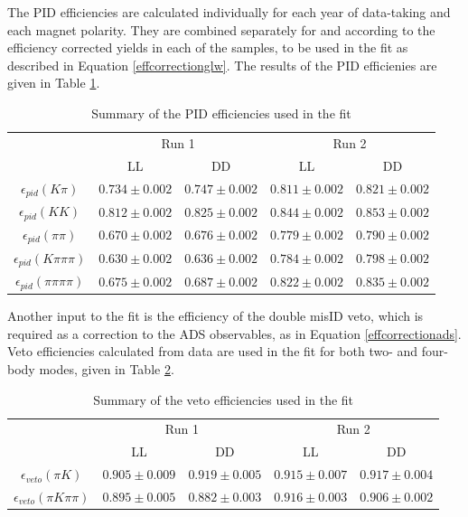 The PID efficiencies are calculated individually for each year of data-taking and each magnet polarity. They are combined separately for \runone and \runtwo according to the efficiency corrected yields in each of the samples, to be used in the \CP fit as described in Equation \ref{effcorrectionglw}. The results of the PID efficienies are given in Table \ref{pideff}.

\begin{table}[h]
\centering
\begin{tabular}{c|cc|cc}
\hline
& \multicolumn{2}{c}{Run 1} & \multicolumn{2}{c}{Run 2} \\
& LL & DD & LL & DD \\
\hline
$\epsilon_{pid}(K\pi)$ & $0.734 \pm 0.002$ & $0.747 \pm 0.002$ & $0.811 \pm 0.002$ & $0.821 \pm 0.002$ \\
$\epsilon_{pid}(KK)$ & $0.812 \pm 0.002$ & $0.825 \pm 0.002$ & $0.844 \pm 0.002$ & $0.853 \pm 0.002$ \\
$\epsilon_{pid}(\pi\pi)$ & $0.670 \pm 0.002$ & $0.676 \pm 0.002$ & $0.779 \pm 0.002$ & $0.790 \pm 0.002$ \\
$\epsilon_{pid}(K\pi\pi\pi)$ & $0.630 \pm 0.002$ & $0.636 \pm 0.002$ & $0.784 \pm 0.002$ & $0.798 \pm 0.002$ \\
$\epsilon_{pid}(\pi\pi\pi\pi)$ & $0.675 \pm 0.002$ & $0.687 \pm 0.002$ & $0.822 \pm 0.002$ & $0.835 \pm 0.002$ \\
\hline
\end{tabular}
\caption{Summary of the PID efficiencies used in the \CP fit}
\label{pideff}
\end{table}

Another input to the fit is the efficiency of the double misID veto, which is required as a correction to the ADS observables, as in Equation \ref{effcorrectionads}. Veto efficiencies calculated from data are used in the \CP fit for both two- and four-body modes, given in Table \ref{vetoeff}.

\begin{table}[h]
\centering
\begin{tabular}{c|cc|cc}
\hline
& \multicolumn{2}{c}{Run 1} & \multicolumn{2}{c}{Run 2} \\
& LL & DD & LL & DD \\
\hline
$\epsilon_{veto}(\pi K)$ & $0.905 \pm 0.009$ & $0.919 \pm 0.005$ & $0.915 \pm 0.007$ & $0.917 \pm 0.004$ \\
$\epsilon_{veto}(\pi K \pi\pi)$ & $0.895 \pm 0.005$ & $0.882 \pm 0.003$ & $0.916 \pm 0.003$ & $0.906 \pm 0.002$ \\
\hline
\end{tabular}
\caption{Summary of the veto efficiencies used in the \CP fit}
\label{vetoeff}
\end{table}

